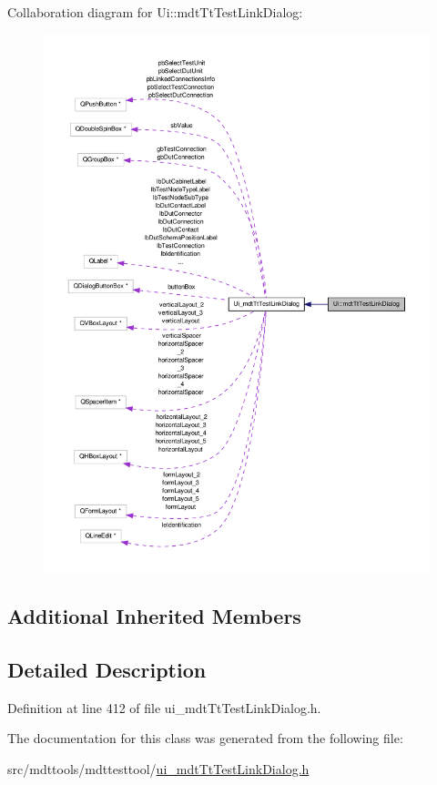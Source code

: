 Collaboration diagram for Ui\-:\-:mdt\-Tt\-Test\-Link\-Dialog\-:\nopagebreak
\begin{figure}[H]
\begin{center}
\leavevmode
\includegraphics[width=350pt]{class_ui_1_1mdt_tt_test_link_dialog__coll__graph}
\end{center}
\end{figure}
\subsection*{Additional Inherited Members}


\subsection{Detailed Description}


Definition at line 412 of file ui\-\_\-mdt\-Tt\-Test\-Link\-Dialog.\-h.



The documentation for this class was generated from the following file\-:\begin{DoxyCompactItemize}
\item 
src/mdttools/mdttesttool/\hyperlink{ui__mdt_tt_test_link_dialog_8h}{ui\-\_\-mdt\-Tt\-Test\-Link\-Dialog.\-h}\end{DoxyCompactItemize}
